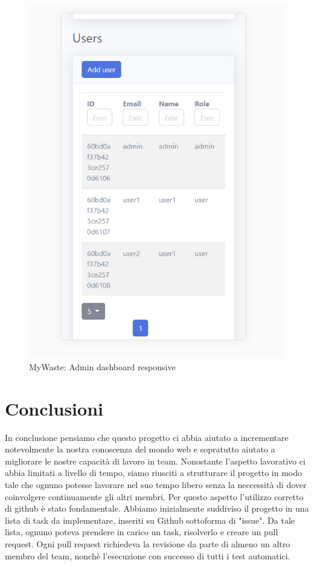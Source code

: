 \documentclass{report}
\begin{document}
\begin{figure}[h!]
    \begin{center}
        \includegraphics[width=1.0\textwidth]{images/adminDashboard_resp3.PNG}  \end{center}
    \caption{MyWaste: Admin dashboard responsive}
    \label{fig:respadmindash3}
\end{figure}


\section{Conclusioni}
In conclusione pensiamo che questo progetto ci abbia aiutato a incrementare notevolmente la nostra conoscenza del mondo web
e sopratutto aiutato a migliorare le nostre capacità di lavoro in team.
Nonostante l'aspetto lavorativo ci abbia limitati a livello di tempo, siamo riusciti a strutturare il progetto in modo tale
che ognuno potesse lavorare nel suo tempo libero senza la neccessità di dover coinvolgere continuamente gli altri membri.
Per questo aspetto l'utilizzo corretto di github è stato fondamentale.
Abbiamo inizialmente suddiviso il progetto in una lista di task da implementare, inseriti su Github sottoforma di "issue".
Da tale lista, ognuno poteva prendere in carico un task, risolverlo e creare un pull request.
Ogni pull request richiedeva la revisione da parte di almeno un altro membro del team, nonchè l'esecuzione con successo
di tutti i test automatici.
\end{document}
